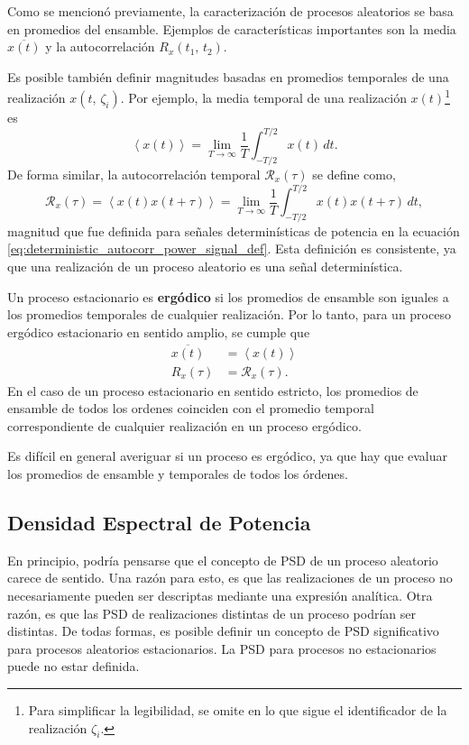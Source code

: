 \documentclass[a4paper]{article}
\begin{document}
Como se mencionó previamente, la caracterización de procesos aleatorios se basa en promedios del ensamble. Ejemplos de características importantes son la media \(\overline{x(t)}\) y la autocorrelación \(R_x(t_1,\,t_2)\).

Es posible también definir magnitudes basadas en promedios temporales de una realización \(x(t,\,\zeta_i)\). Por ejemplo, la media temporal de una realización \(x(t)\)\footnote{Para simplificar la legibilidad, se omite en lo que sigue el identificador de la realización \(\zeta_i\).} es
\[
 \left<x(t)\right>=\lim_{T\to\infty}\frac{1}{T}\int_{-T/2}^{T/2}x(t)\,dt.
\]
De forma similar, la autocorrelación temporal \(\mathcal{R}_x(\tau)\) se define como,
\[
 \mathcal{R}_x(\tau)=\left<x(t)x(t+\tau)\right>=\lim_{T\to\infty}\frac{1}{T}\int_{-T/2}^{T/2}x(t)x(t+\tau)\,dt,
\]
magnitud que fue definida para señales determinísticas de potencia en la ecuación \ref{eq:deterministic_autocorr_power_signal_def}. Esta definición es consistente, ya que una realización de un proceso aleatorio es una señal determinística. 

Un proceso estacionario es \textbf{ergódico} si los promedios de ensamble son iguales a los promedios temporales de cualquier realización. Por lo tanto, para un proceso ergódico estacionario en sentido amplio, se cumple que
\begin{align*}
 \overline{x(t)}&=\left<x(t)\right>\\
 R_x(\tau)&=\mathcal{R}_x(\tau).
\end{align*}
En el caso de un proceso estacionario en sentido estricto, los promedios de ensamble de todos los ordenes coinciden con el promedio temporal correspondiente de cualquier realización en un proceso ergódico.

Es difícil en general averiguar si un proceso es ergódico, ya que hay que evaluar los promedios de ensamble y temporales de todos los órdenes.

\subsection{Densidad Espectral de Potencia}

En principio, podría pensarse que el concepto de PSD de un proceso aleatorio carece de sentido. Una razón para esto, es que las realizaciones de un proceso no necesariamente pueden ser descriptas mediante una expresión analítica. Otra razón, es que las PSD de realizaciones distintas de un proceso podrían ser distintas. De todas formas, es posible definir un concepto de PSD significativo para procesos aleatorios estacionarios. La PSD para procesos no estacionarios puede no estar definida.
\end{document}
